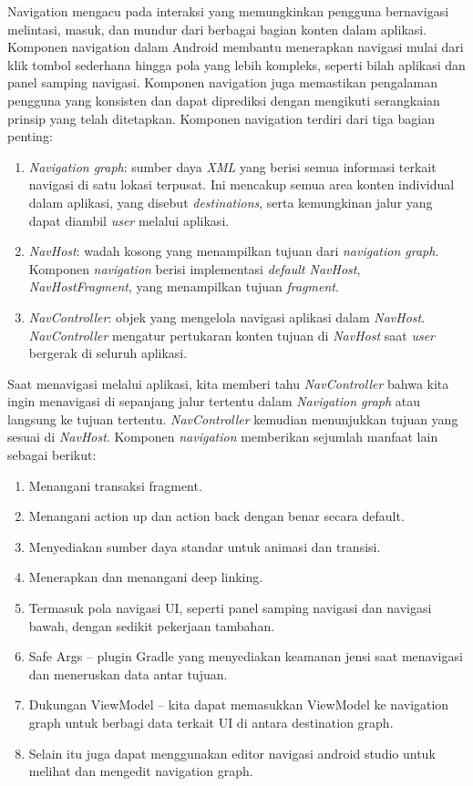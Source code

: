 Navigation mengacu pada interaksi yang memungkinkan pengguna bernavigasi melintasi, masuk, dan mundur dari berbagai bagian konten dalam aplikasi. Komponen navigation dalam Android membantu menerapkan navigasi mulai dari klik tombol sederhana hingga pola yang lebih kompleks, seperti bilah aplikasi dan panel samping navigasi. Komponen navigation juga memastikan pengalaman pengguna yang konsisten dan dapat diprediksi dengan mengikuti serangkaian prinsip yang telah ditetapkan.
Komponen navigation terdiri dari tiga bagian penting:
\begin{enumerate}
\item{\textit{Navigation graph}: sumber daya \textit{XML} yang berisi semua informasi terkait navigasi di satu lokasi terpusat. Ini mencakup semua area konten individual dalam aplikasi, yang disebut \textit{destinations}, serta kemungkinan jalur yang dapat diambil \textit{user} melalui aplikasi.}
\item{\textit{NavHost}: wadah kosong yang menampilkan tujuan dari \textit{navigation graph}. Komponen \textit{navigation} berisi implementasi \textit{default NavHost}, \textit{NavHostFragment}, yang menampilkan tujuan \textit{fragment}.}
\item{\textit{NavController}: objek yang mengelola navigasi aplikasi dalam \textit{NavHost}. \textit{NavController} mengatur pertukaran konten tujuan di \textit{NavHost} saat \textit{user} bergerak di seluruh aplikasi.}
\end{enumerate}

Saat menavigasi melalui aplikasi, kita memberi tahu \textit{NavController} bahwa kita ingin menavigasi di sepanjang jalur tertentu dalam \textit{Navigation graph} atau langsung ke tujuan tertentu. \textit{NavController} kemudian menunjukkan tujuan yang sesuai di \textit{NavHost}. Komponen \textit{navigation} memberikan sejumlah manfaat lain sebagai berikut:

\begin{enumerate}
\item Menangani transaksi fragment.
\item Menangani action up dan action back dengan benar secara default.
\item Menyediakan sumber daya standar untuk animasi dan transisi.
\item Menerapkan dan menangani deep linking.
\item Termasuk pola navigasi UI, seperti panel samping navigasi dan navigasi bawah, dengan sedikit pekerjaan tambahan.
\item Safe Args – plugin Gradle yang menyediakan keamanan jensi saat menavigasi dan meneruskan data antar tujuan.
\item Dukungan ViewModel – kita dapat memasukkan ViewModel ke navigation graph untuk berbagi data terkait UI di antara destination graph.
\item Selain itu juga dapat menggunakan editor navigasi android studio untuk melihat dan mengedit navigation graph.
\end{enumerate}

